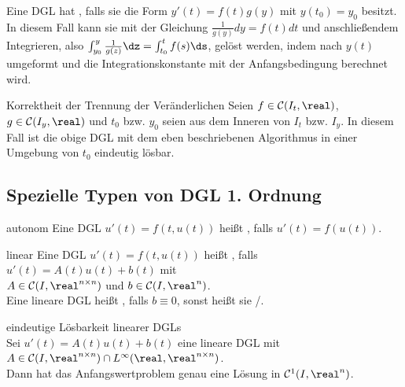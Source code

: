\begin{Bem}
    Eine DGL hat , falls sie die Form
    $y'(t) = f(t) g(y)$ mit $y(t_0) = y_0$ besitzt.
    In diesem Fall kann sie mit der Gleichung
    $\frac{1}{g(y)} dy = f(t) dt$ und anschließendem Integrieren, also
    $\int_{y_0}^y \frac{1}{g(z)}\dz = \int_{t_0}^t f(s)\ds$, gelöst werden,
    indem nach $y(t)$ umgeformt und die Integrationskonstante mit der
    Anfangsbedingung berechnet wird.
\end{Bem}

\begin{Satz}{Korrektheit der Trennung der Veränderlichen}
    Seien $f \in \C(I_t, \real)$, $g \in \C(I_y, \real)$ und
    $t_0$ bzw. $y_0$ seien aus dem Inneren von $I_t$ bzw. $I_y$.
    In diesem Fall ist die obige DGL mit dem eben beschriebenen Algorithmus
    in einer Umgebung von $t_0$ eindeutig lösbar.
\end{Satz}

\pagebreak

\subsection{%
    Spezielle Typen von DGL 1. Ordnung%
}

\begin{Def}{autonom}
    Eine DGL $u'(t) = f(t, u(t))$ heißt ,
    falls $u'(t) = f(u(t))$.
\end{Def}

\begin{Def}{linear}
    Eine DGL $u'(t) = f(t, u(t))$ heißt ,
    falls $u'(t) = A(t) u(t) + b(t)$ mit\\
    $A \in \C(I, \real^{n \times n})$ und $b \in \C(I, \real^n)$.\\
    Eine lineare DGL heißt , falls $b \equiv 0$,
    sonst heißt sie /.
\end{Def}

\begin{Satz}{eindeutige Lösbarkeit linearer DGLs}\\
    Sei $u'(t) = A(t)u(t) + b(t)$ eine lineare DGL mit
    $A \in \C(I, \real^{n \times n}) \cap
    L^\infty(\real, \real^{n \times n})$.\\
    Dann hat das Anfangswertproblem genau eine Lösung in $\C^1(I, \real^n)$.
\end{Satz}

